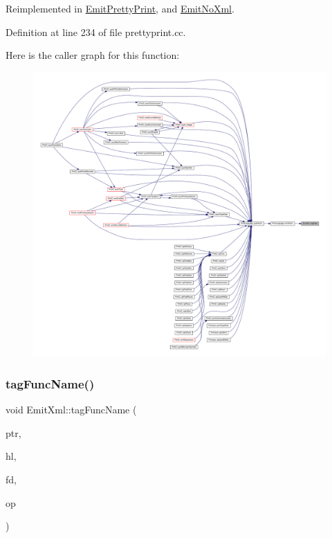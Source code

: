 Reimplemented in \mbox{\hyperlink{class_emit_pretty_print_a5876b8de594c02635fbb0df518a38961}{Emit\+Pretty\+Print}}, and \mbox{\hyperlink{class_emit_no_xml_aa7afe6c48fea19d04d718305d909716f}{Emit\+No\+Xml}}.



Definition at line 234 of file prettyprint.\+cc.

Here is the caller graph for this function\+:
\nopagebreak
\begin{figure}[H]
\begin{center}
\leavevmode
\includegraphics[width=350pt]{class_emit_xml_a2494b76d6f02bd0848af3f72b8def6e3_icgraph}
\end{center}
\end{figure}
\mbox{\label{class_emit_xml_a735e928e65b3dbd028803b6a46262732}} 
\subsubsection{\texorpdfstring{tagFuncName()}{tagFuncName()}}
{\footnotesize\ttfamily void Emit\+Xml\+::tag\+Func\+Name (\begin{DoxyParamCaption}\item[{const char $\ast$}]{ptr,  }\item[{\mbox{\hyperlink{class_emit_xml_a7c3577436da429c3c75f4b82cac6864f}{syntax\+\_\+highlight}}}]{hl,  }\item[{const \mbox{\hyperlink{class_funcdata}{Funcdata}} $\ast$}]{fd,  }\item[{const \mbox{\hyperlink{class_pcode_op}{Pcode\+Op}} $\ast$}]{op }\end{DoxyParamCaption})\hspace{0.3cm}{\ttfamily [virtual]}}




